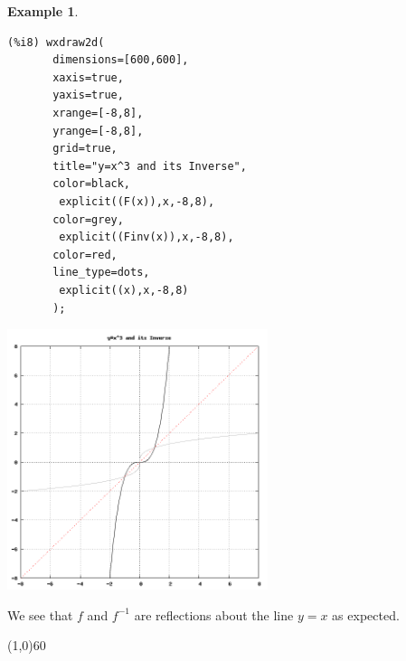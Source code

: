 \documentclass[10.5pt,twoside]{report}
\theoremstyle{definition}
\newtheorem{exmp}{Example}[section]
\begin{document}
\begin{exmp}
\begin{verbatim}
(%i8) wxdraw2d(
       dimensions=[600,600],
       xaxis=true,
       yaxis=true,
       xrange=[-8,8],
       yrange=[-8,8],
       grid=true,
       title="y=x^3 and its Inverse",
       color=black,
        explicit((F(x)),x,-8,8),
       color=grey,
        explicit((Finv(x)),x,-8,8),
       color=red,
       line_type=dots,
        explicit((x),x,-8,8)
       );
\end{verbatim}


\includegraphics[width=3in]{example_2_4_1_2}


We see that $f$ and $f^{-1}$ are reflections about the line $y=x$ as expected.

\end{exmp}

\line(1,0){60}
\linethickness{0.5mm}
\end{document}
